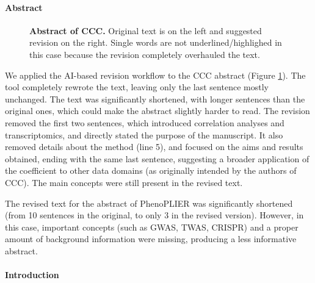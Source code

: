\documentclass[
]{article}
\providecommand{\DIFaddbeginFL}{} %
\providecommand{\DIFaddendFL}{} %
\providecommand{\DIFdelbeginFL}{} %
\providecommand{\DIFdelendFL}{} %
\newcommand{\DIFscaledelfig}{0.5}
\newlength{\DIFdelgraphicswidth} %
\newlength{\DIFdelgraphicsheight} %
\newcommand{\DIFaddincludegraphics}[2][]{{\color{blue}\fbox{\DIFOincludegraphics[#1]{#2}}}} %
\newcommand{\DIFdelincludegraphics}[2][]{%
\sbox{\DIFdelgraphicsbox}{\DIFOincludegraphics[#1]{#2}}%
\settoboxwidth{\DIFdelgraphicswidth}{\DIFdelgraphicsbox} %
\settoboxtotalheight{\DIFdelgraphicsheight}{\DIFdelgraphicsbox} %
\scalebox{\DIFscaledelfig}{%
\parbox[b]{\DIFdelgraphicswidth}{\usebox{\DIFdelgraphicsbox}\\[-\baselineskip] \rule{\DIFdelgraphicswidth}{0em}}\llap{\resizebox{\DIFdelgraphicswidth}{\DIFdelgraphicsheight}{%
\setlength{\unitlength}{\DIFdelgraphicswidth}%
\begin{picture}(1,1)%
\thicklines\linethickness{2pt} %
{\color[rgb]{1,0,0}\put(0,0){\framebox(1,1){}}}%
{\color[rgb]{1,0,0}\put(0,0){\line( 1,1){1}}}%
{\color[rgb]{1,0,0}\put(0,1){\line(1,-1){1}}}%
\end{picture}%
}\hspace*{3pt}}} %
} %
\DeclareRobustCommand{\DIFaddbeginFL}{\DIFOaddbeginFL \let\includegraphics\DIFaddincludegraphics} %
\DeclareRobustCommand{\DIFaddendFL}{\DIFOaddendFL \let\includegraphics\DIFOincludegraphics} %
\DeclareRobustCommand{\DIFdelbeginFL}{\DIFOdelbeginFL \let\includegraphics\DIFdelincludegraphics} %
\DeclareRobustCommand{\DIFdelendFL}{\DIFOaddendFL \let\includegraphics\DIFOincludegraphics} %
\begin{document}
\hypertarget{abstract-1}{%
\paragraph{Abstract}\label{abstract-1}}

\begin{figure}
\DIFdelbeginFL %
\DIFdelendFL \DIFaddbeginFL \hypertarget{fig:abstract:ccc}{%
\centering

\caption{\textbf{Abstract of CCC.}
Original text is on the left and suggested revision on the right.
Single words are not underlined/highlighed in this case because the revision completely overhauled the text.}\label{fig:abstract:ccc}
}
\DIFaddendFL \end{figure}

We applied the AI-based revision workflow to the CCC abstract (Figure \ref{fig:abstract:ccc}).
The tool completely rewrote the text, leaving only the last sentence mostly unchanged.
The text was significantly shortened, with longer sentences than the original ones, which could make the abstract slightly harder to read.
The revision removed the first two sentences, which introduced correlation analyses and transcriptomics, and directly stated the purpose of the manuscript.
It also removed details about the method (line 5), and focused on the aims and results obtained, ending with the same last sentence, suggesting a broader application of the coefficient to other data domains (as originally intended by the authors of CCC).
The main concepts were still present in the revised text.

The revised text for the abstract of PhenoPLIER was significantly shortened (from 10 sentences in the original, to only 3 in the revised version).
However, in this case, important concepts (such as GWAS, TWAS, CRISPR) and a proper amount of background information were missing, producing a less informative abstract.

\hypertarget{introduction-1}{%
\paragraph{Introduction}\label{introduction-1}}
\end{document}
